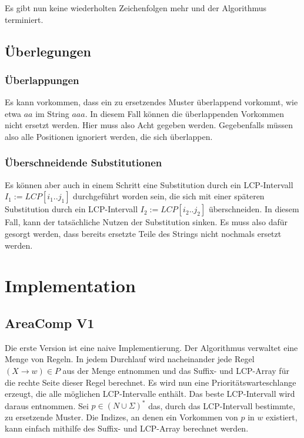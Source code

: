 Es gibt nun keine wiederholten Zeichenfolgen mehr und der Algorithmus terminiert.

\subsection{Überlegungen}

\subsubsection{Überlappungen}

Es kann vorkommen, dass ein zu ersetzendes Muster überlappend vorkommt, wie etwa $aa$ im String $aaa$. In diesem Fall können die überlappenden Vorkommen nicht ersetzt werden. Hier muss also Acht gegeben werden. Gegebenfalls müssen also alle Positionen ignoriert werden, die sich überlappen.

\subsubsection{Überschneidende Substitutionen}

Es können aber auch in einem Schritt eine Substitution durch ein LCP-Intervall $I_1 := LCP[i_1..j_1]$ durchgeführt worden sein, die sich mit einer späteren Substitution durch ein LCP-Intervall $I_2 := LCP[i_2..j_2]$ überschneiden. In diesem Fall, kann der tatsächliche Nutzen der Substitution sinken. Es muss also dafür gesorgt werden, dass bereits ersetzte Teile des Strings nicht nochmals ersetzt werden.

\section{Implementation}

\subsection{AreaComp V1}

Die erste Version ist eine naive Implementierung. Der Algorithmus verwaltet eine Menge von Regeln. In jedem Durchlauf wird nacheinander jede Regel $(X \rightarrow w) \in P$ aus der Menge entnommen und das Suffix- und LCP-Array für die rechte Seite dieser Regel berechnet. Es wird nun eine Prioritätswarteschlange erzeugt, die alle möglichen LCP-Intervalle enthält. Das beste LCP-Intervall wird daraus entnommen. Sei $p \in (N \cup \Sigma)^*$ das, durch das LCP-Intervall bestimmte, zu ersetzende Muster. Die Indizes, an denen ein Vorkommen von $p$ in $w$ existiert, kann einfach mithilfe des Suffix- und LCP-Array berechnet werden.

